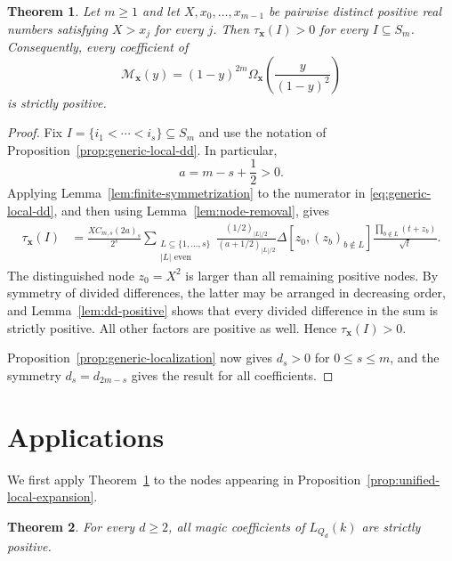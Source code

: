 \documentclass[12pt]{amsart}
\newtheorem{Theorem}{Theorem}[section]
\theoremstyle{definition}
\newcommand{\DD}{\Delta}
\begin{document}
\begin{Theorem}\label{thm:node-positivity}
Let $m\ge1$ and let $X,x_0,\ldots,x_{m-1}$
be pairwise distinct positive real numbers satisfying $X>x_j$ for every
$j$.  Then $\tau_{\mathbf x}(I)>0$ for every $I\subseteq S_m$.
Consequently, every coefficient of
\[
\mathcal M_{\mathbf x}(y)
=
(1-y)^{2m}
\Omega_{\mathbf x}\left(\frac{y}{(1-y)^2}\right)
\]
is strictly positive.
\end{Theorem}

\begin{proof}
Fix $I=\{i_1<\cdots<i_s\}\subseteq S_m$ and use the notation of
Proposition~\ref{prop:generic-local-dd}.  In particular,
\[
a=m-s+\frac12>0.
\]
Applying Lemma~\ref{lem:finite-symmetrization} to the numerator in
\eqref{eq:generic-local-dd}, and then using
Lemma~\ref{lem:node-removal}, gives
\[
\begin{aligned}
\tau_{\mathbf x}(I)
&=
\frac{XC_{m,s}(2a)_s}{2^s}
\sum_{\substack{L\subseteq\{1,\ldots,s\}\\|L|\text{ even}}}
\frac{(1/2)_{|L|/2}}{(a+1/2)_{|L|/2}} 
\DD[z_0,(z_b)_{b\notin L}]
\frac{\prod_{b\notin L}(t+z_b)}{\sqrt t}.
\end{aligned}
\]
The distinguished node $z_0=X^2$ is larger than all remaining positive
nodes.  By symmetry of divided differences, the latter may be arranged in
decreasing order, and Lemma~\ref{lem:dd-positive} shows that every divided
difference in the sum is strictly positive.  All other factors are positive
as well.  
Hence $\tau_{\mathbf x}(I)>0$.

Proposition~\ref{prop:generic-localization} now gives $d_s>0$ for
$0\le s\le m$, and the symmetry $d_s=d_{2m-s}$ gives the result for all
coefficients.
\end{proof}


\section{Applications}\label{sec:applications}

We first apply Theorem~\ref{thm:node-positivity} to the nodes
appearing in Proposition~\ref{prop:unified-local-expansion}.

\begin{Theorem}\label{thm:Q-magic}
For every $d\ge2$, all magic coefficients of $L_{Q_d}(k)$ are strictly
positive.
\end{Theorem}
\end{document}
